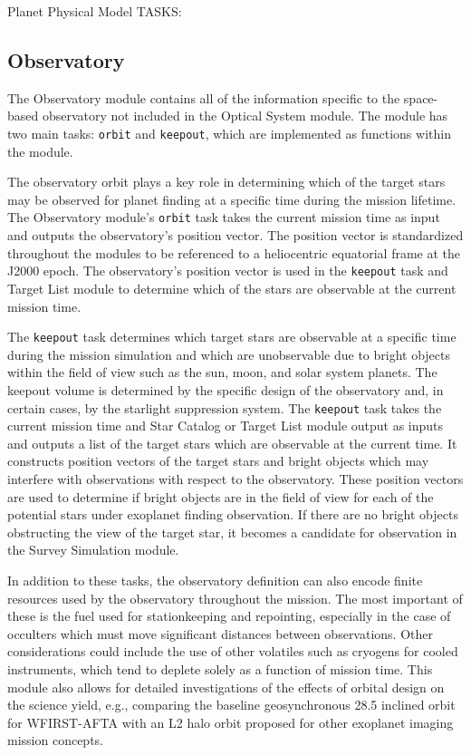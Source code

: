 \documentclass[cleanfoot]{asme2ej}
\begin{document}
Planet Physical Model TASKS:


\subsection{Observatory}
The Observatory module contains all of the information specific to the space-based observatory not included in the Optical System module. The module has two main tasks: \verb+orbit+ and \verb+keepout+, which are implemented as functions within the module. 

The observatory orbit plays a key role in determining which of the target stars may be observed for planet finding at a specific time during the mission lifetime. The Observatory module's \verb+orbit+ task takes the current mission time as input and outputs the observatory's position vector. The position vector is standardized throughout the modules to be referenced to a heliocentric equatorial frame at the J2000 epoch. The observatory's position vector is used in the \verb+keepout+ task and Target List module to determine which of the stars are observable at the current mission time.

The \verb+keepout+ task determines which target stars are observable at a specific time during the mission simulation and which are unobservable due to bright objects within the field of view such as the sun, moon, and solar system planets.  The keepout volume is determined by the specific design of the observatory and, in certain cases, by the starlight suppression system.  The \verb+keepout+ task takes the current mission time and Star Catalog or Target List module output as inputs and outputs a list of the target stars which are observable at the current time. It constructs position vectors of the target stars and bright objects which may interfere with observations with respect to the observatory. These position vectors are used to determine if bright objects are in the field of view for each of the potential stars under exoplanet finding observation.  If there are no bright objects obstructing the view of the target star, it becomes a candidate for observation in the Survey Simulation module.

In addition to these tasks, the observatory definition can also encode finite resources used by the observatory throughout the mission.  The most important of these is the fuel used for stationkeeping and repointing, especially in the case of occulters which must move significant distances between observations.  Other considerations could include the use of other volatiles such as cryogens for cooled instruments, which tend to deplete solely as a function of mission time.  This module also allows for detailed investigations of the effects of orbital design on the science yield, e.g., comparing the baseline geosynchronous 28.5\textdegree{} inclined orbit for WFIRST-AFTA with an L2 halo orbit proposed for other exoplanet imaging mission concepts. 
\end{document}
